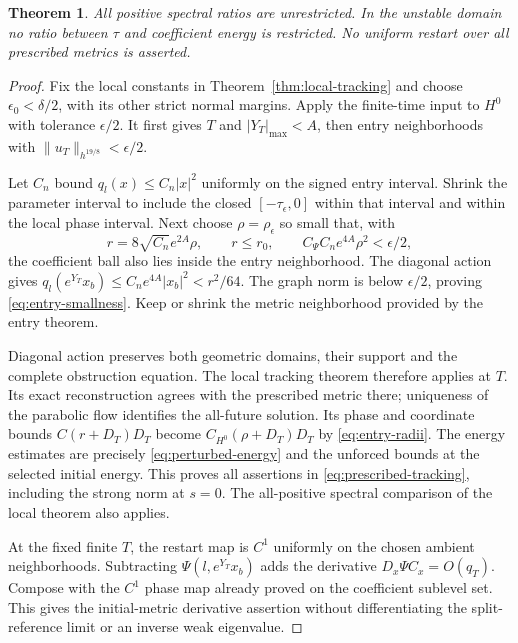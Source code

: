\documentclass[11pt]{amsart}
\newtheorem{theorem}{Theorem}[section]
\theoremstyle{definition}
\theoremstyle{remark}
\begin{document}
\begin{theorem}
All positive spectral ratios are unrestricted. In the
unstable domain no ratio between $\tau$ and coefficient
energy is restricted. No uniform restart over all prescribed
metrics is asserted.
\end{theorem}
\begin{proof}
Fix the local constants in Theorem~\ref{thm:local-tracking}
and choose $\epsilon_0<\delta/2$, with its other strict
normal margins. Apply the finite-time input to $H^0$
with tolerance $\epsilon/2$. It first gives $T$ and
$|Y_T|_{\max}<A$, then entry neighborhoods with
$\|u_T\|_{h^{19/8}}<\epsilon/2$.

Let $C_n$ bound $q_l(x)\le C_n|x|^2$ uniformly on the
signed entry interval. Shrink the parameter interval to
include the closed $[-\tau_\epsilon,0]$ within that interval
and within the local phase interval. Next choose
$\rho=\rho_\epsilon$ so small that, with
\begin{equation}\label{eq:entry-radii}
 r=8\sqrt{C_n}e^{2A}\rho,
 \qquad r\le r_0,\qquad
 C_\Psi C_ne^{4A}\rho^2<\epsilon/2 ,
\end{equation}
the coefficient ball also lies inside the entry neighborhood.
The diagonal action gives
$q_l(e^{Y_T}x_b)\le C_ne^{4A}|x_b|^2<r^2/64$.
The graph norm is below $\epsilon/2$, proving
\eqref{eq:entry-smallness}. Keep or shrink the metric
neighborhood provided by the entry theorem.

Diagonal action preserves both geometric domains, their
support and the complete obstruction equation. The local
tracking theorem therefore applies at $T$. Its exact
reconstruction agrees with the prescribed metric there;
uniqueness of the parabolic flow identifies the all-future
solution. Its phase and coordinate bounds
$C(r+D_T)D_T$ become $C_{H^0}(\rho+D_T)D_T$ by
\eqref{eq:entry-radii}. The energy estimates are precisely
\eqref{eq:perturbed-energy} and the unforced bounds at the
selected initial energy. This proves all assertions in
\eqref{eq:prescribed-tracking}, including the strong norm
at $s=0$. The all-positive spectral comparison of the
local theorem also applies.

At the fixed finite $T$, the restart map is $C^1$ uniformly
on the chosen ambient neighborhoods. Subtracting
$\Psi(l,e^{Y_T}x_b)$ adds the derivative
$D_x\Psi C_x=O(q_T)$. Compose with the $C^1$ phase map
already proved on the coefficient sublevel set. This gives
the initial-metric derivative assertion without differentiating
the split-reference limit or an inverse weak eigenvalue.
\end{proof}
\end{document}
